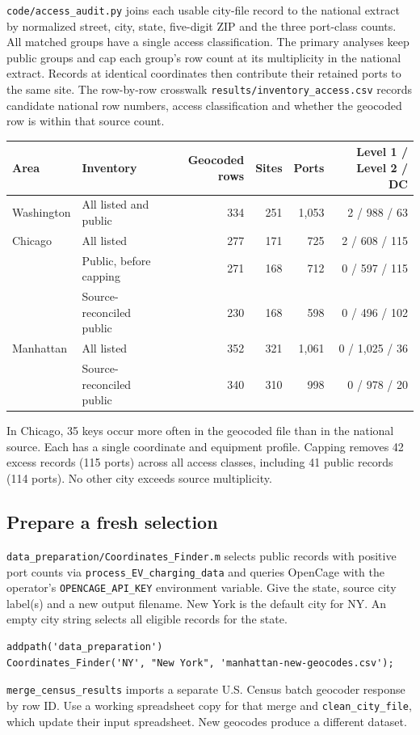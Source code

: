 \documentclass[11pt,a4paper]{article}
\begin{document}
\texttt{code/access\_audit.py} joins each usable city-file record to the national extract by normalized street, city, state, five-digit ZIP and the three port-class counts. All matched groups have a single access classification. The primary analyses keep public groups and cap each group's row count at its multiplicity in the national extract. Records at identical coordinates then contribute their retained ports to the same site. The row-by-row crosswalk \texttt{results/inventory\_access.csv} records candidate national row numbers, access classification and whether the geocoded row is within that source count.
\begin{center}\small
\begin{tabular}{llrrrr}
\toprule
Area & Inventory & Geocoded rows & Sites & Ports & Level 1 / Level 2 / DC \\
\midrule
Washington & All listed and public & 334 & 251 & 1,053 & 2 / 988 / 63 \\
Chicago & All listed & 277 & 171 & 725 & 2 / 608 / 115 \\
        & Public, before capping & 271 & 168 & 712 & 0 / 597 / 115 \\
        & Source-reconciled public & 230 & 168 & 598 & 0 / 496 / 102 \\
Manhattan & All listed & 352 & 321 & 1,061 & 0 / 1,025 / 36 \\
          & Source-reconciled public & 340 & 310 & 998 & 0 / 978 / 20 \\
\bottomrule
\end{tabular}
\end{center}
In Chicago, 35 keys occur more often in the geocoded file than in the national source. Each has a single coordinate and equipment profile. Capping removes 42 excess records (115 ports) across all access classes, including 41 public records (114 ports). No other city exceeds source multiplicity.

\subsection*{Prepare a fresh selection}
\texttt{data\_preparation/Coordinates\_Finder.m} selects public records with positive port counts via \texttt{process\_EV\_charging\_data} and queries OpenCage with the operator's \texttt{OPENCAGE\_API\_KEY} environment variable. Give the state, source city label(s) and a new output filename. New York is the default city for NY. An empty city string selects all eligible records for the state.
\begin{lstlisting}
addpath('data_preparation')
Coordinates_Finder('NY', "New York", 'manhattan-new-geocodes.csv');
\end{lstlisting}
\texttt{merge\_census\_results} imports a separate U.S. Census batch geocoder response by row ID. Use a working spreadsheet copy for that merge and \texttt{clean\_city\_file}, which update their input spreadsheet. New geocodes produce a different dataset.
\end{document}
